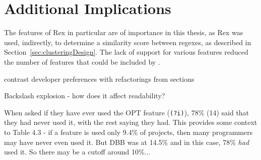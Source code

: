 \section{Additional Implications}

The features of Rex in particular are of importance in this thesis, as Rex was used, indirectly, to determine a similarity score between regexes, as described in Section~\ref{sec:clusteringDesign}.  The lack of support for various features reduced the number of features that could be included by .

contrast developer preferences with refactorings from sections

Backslash explosion - how does it affect readability?






When asked if they have ever used the OPT feature (\verb!(?i)!), 78\% (14) said that they had never used it, with the rest saying they had.  This provides some context to Table 4.3 - if a feature is used only 9.4\% of projects, then many programmers may have never even used it.  But DBB was at 14.5\% and in this case, 78\% \emph{had} used it.  So there may be a cutoff around 10\%...



% 

